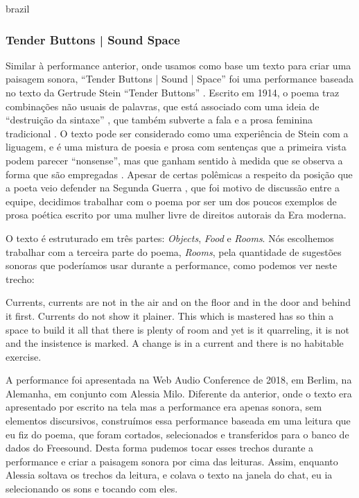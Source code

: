 \begin{otherlanguage*}{brazil}
\subsubsection{Tender Buttons | Sound Space}
Similar à performance anterior, onde usamos como base um texto para criar uma paisagem sonora, ``Tender Buttons | Sound | Space''  foi uma performance baseada no texto da Gertrude Stein ``Tender Buttons'' \cite{Stein1914}. Escrito em 1914, o poema traz combinações não usuais de palavras, que está associado com uma ideia de ``destruição da sintaxe'' \cite{Perloff1996}, que também subverte a fala e a prosa feminina tradicional \cite{Murphy1991}. O texto pode ser considerado como uma experiência de Stein com a liguagem, e é uma mistura de poesia e prosa com sentenças que a primeira vista podem parecer ``nonsense'', mas que ganham sentido à medida que se observa a forma que são empregadas \cite{Perloff1996}. Apesar de certas polêmicas a respeito da posição que a poeta veio defender na Segunda Guerra \cite{Bernstein2012}, que foi motivo de discussão entre a equipe, decidimos trabalhar com o poema por ser um dos poucos exemplos de prosa poética escrito por uma mulher livre de direitos autorais da Era moderna.

O texto é estruturado em três partes: \textit{Objects}, \textit{Food} e \textit{Rooms}. Nós escolhemos trabalhar com a terceira parte do poema, \textit{Rooms}, pela quantidade de sugestões sonoras que poderíamos usar durante a performance, como podemos ver neste trecho:

\begin{citacao}
Currents, currents are not in the air and on the floor and in the door and behind it first. Currents do not show it plainer. This which is mastered has so thin a space to build it all that there is plenty of room and yet is it quarreling, it is not and the insistence is marked. A change is in a current and there is no habitable exercise. \cite{Stein1914}
\end{citacao} 

A performance foi apresentada na Web Audio Conference de 2018, em Berlim, na Alemanha, em conjunto com Alessia Milo. Diferente da anterior, onde o texto era apresentado por escrito na tela mas a performance era apenas sonora, sem elementos discursivos, construímos essa performance baseada em uma leitura que eu fiz do poema, que foram cortados, selecionados e transferidos para o banco de dados do Freesound. Desta forma pudemos tocar esses trechos durante a performance e criar a paisagem sonora por cima das leituras. Assim, enquanto Alessia soltava os trechos da leitura, e colava o texto na janela do chat, eu ia selecionando os sons e tocando com eles. 


\end{otherlanguage*}
